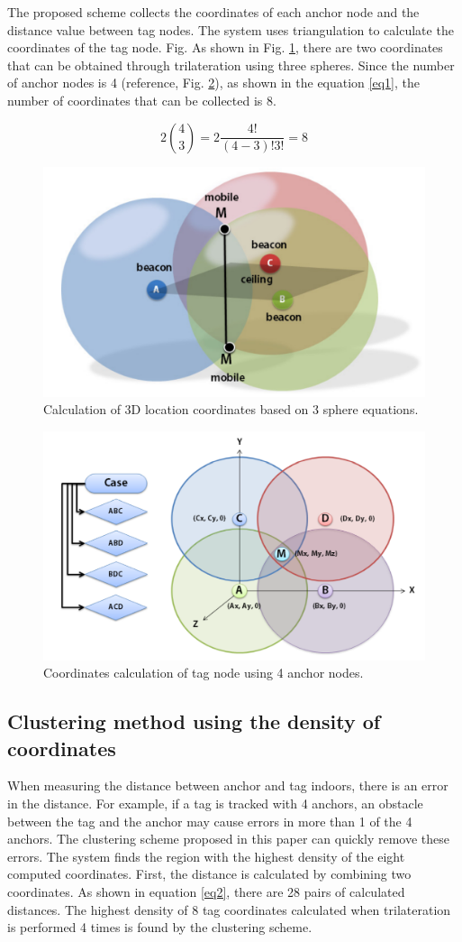 \documentclass[conference]{IEEEtran}
\begin{document}
The proposed scheme collects the coordinates of each anchor node and the distance value between tag nodes. The system uses triangulation to calculate the coordinates of the tag node. Fig. As shown in Fig. \ref{fig1}, there are two coordinates that can be obtained through trilateration using three spheres. Since the number of anchor nodes is 4 (reference, Fig. \ref{fig2}), as shown in the equation \ref{eq1}, the number of coordinates that can be collected is 8.

\begin{equation}
2\binom{4}{3} = 2\frac{4!}{(4-3)!3!}=8\label{eq1}
\end{equation}

\begin{figure}[htbp]
\centerline{\includegraphics[width=0.62\columnwidth]{fig2.png}}
\caption{Calculation of 3D location coordinates based on 3 sphere equations.}
\label{fig1}
\end{figure}

\begin{figure}[htbp]
\centerline{\includegraphics[width=0.62\columnwidth]{fig1.png}}
\caption{Coordinates calculation of tag node using 4 anchor nodes.}
\label{fig2}
\end{figure}

\subsection{Clustering method using the density of coordinates}
When measuring the distance between anchor and tag indoors, there is an error in the distance. For example, if a tag is tracked with 4 anchors, an obstacle between the tag and the anchor may cause errors in more than 1 of the 4 anchors. The clustering scheme proposed in this paper can quickly remove these errors. The system finds the region with the highest density of the eight computed coordinates. First, the distance is calculated by combining two coordinates. As shown in equation \ref{eq2}, there are 28 pairs of calculated distances. The highest density of 8 tag coordinates calculated when trilateration is performed 4 times is found by the clustering scheme.
\end{document}
